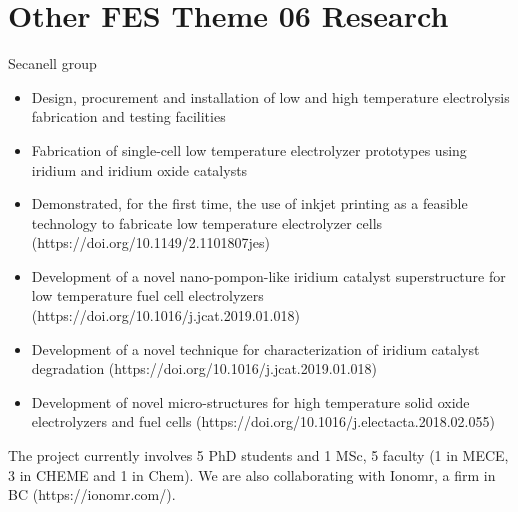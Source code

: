 \documentclass{beamer}
\begin{document}
\section{Other FES Theme 06 Research}
\begin{frame} Secanell group
\begin{block}{}
\footnotesize{\begin{itemize}
  \item Design, procurement and installation of low and high temperature electrolysis fabrication and testing facilities
  \item Fabrication of single-cell low temperature electrolyzer prototypes using iridium and iridium oxide catalysts
  \item Demonstrated, for the first time, the use of inkjet printing as a feasible technology to fabricate low temperature electrolyzer cells  (https://doi.org/10.1149/2.1101807jes)
   \item Development of a novel nano-pompon-like iridium catalyst superstructure for low temperature fuel cell electrolyzers (https://doi.org/10.1016/j.jcat.2019.01.018)
   \item Development of a novel technique for characterization of iridium catalyst degradation (https://doi.org/10.1016/j.jcat.2019.01.018)
 \item Development of novel micro-structures for high temperature solid oxide electrolyzers and fuel cells (https://doi.org/10.1016/j.electacta.2018.02.055)
  \end{itemize}}
The project currently involves 5 PhD students and 1 MSc, 5 faculty (1 in MECE, 3 in CHEME and 1 in Chem). We are also collaborating with Ionomr, a firm in BC (https://ionomr.com/).
  \end{block}
   \vfill
\end{frame}
\end{document}
